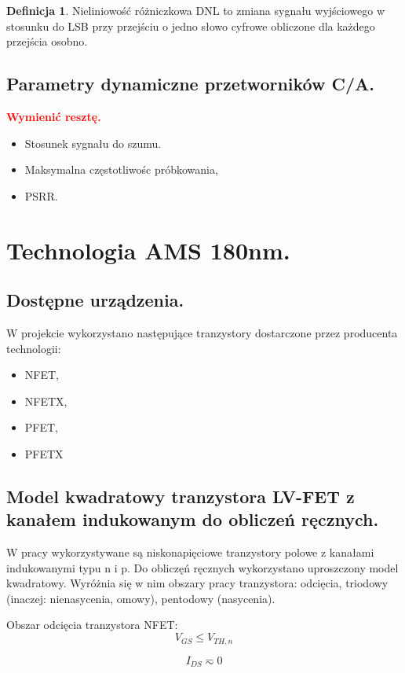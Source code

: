 \documentclass[10pt,a4paper]{report}
\theoremstyle{definition}
\theoremstyle{definition}
\newtheorem{definition}{Definicja}[section]
\theoremstyle{definition}
\theoremstyle{definition}
\theoremstyle{definition}
\begin{document}
	\begin{definition}{Nieliniowość różniczkowa DNL to zmiana sygnału wyjściowego w stosunku do LSB przy przejściu o jedno słowo cyfrowe obliczone dla każdego przejścia osobno. }

	\end{definition}	

	\section{Parametry dynamiczne przetworników C/A.}
	{ \textbf{\textcolor{red}{Wymienić resztę.}}
	}

	{
		\begin{itemize}
			\item Stosunek sygnału do szumu.
			\item Maksymalna częstotliwośc próbkowania,
			\item PSRR.
		\end{itemize} 
	}

	\chapter{Technologia AMS 180nm.}
	
	\section{Dostępne urządzenia.}
	{	W projekcie wykorzystano następujące tranzystory dostarczone przez producenta technologii:
		\begin{itemize}
			\item NFET,
			\item NFETX,
			\item PFET,
			\item PFETX
		\end{itemize}
   }
	\section{Model kwadratowy tranzystora LV-FET z kanałem indukowanym do obliczeń ręcznych.}
	{ 	W pracy wykorzystywane są niskonapięciowe tranzystory polowe z kanałami indukowanymi typu n i p. Do obliczęń ręcznych wykorzystano uproszczony model kwadratowy. Wyróżnia się w nim obszary pracy tranzystora: odcięcia, triodowy (inaczej: nienasycenia, omowy), pentodowy (nasycenia). }
	
	{	Obszar odcięcia tranzystora NFET:
		\begin{equation}
			V_{GS} \leq V_{TH,n}
		\end{equation}
		
		\begin{equation}
			I_{DS} \eqsim 0
		\end{equation}
	}
	
\end{document}
